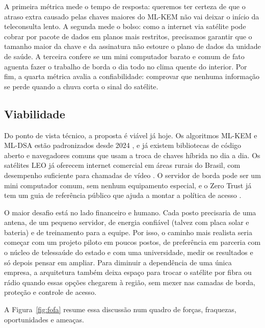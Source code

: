 \documentclass[12pt,a4paper]{article}
\begin{document}
A primeira métrica mede o tempo de resposta: queremos ter certeza de que o atraso extra causado pelas chaves maiores do ML-KEM não vai deixar o início da teleconsulta lento. A segunda mede o bolso: como a internet via satélite pode cobrar por pacote de dados em planos mais restritos, precisamos garantir que o tamanho maior da chave e da assinatura não estoure o plano de dados da unidade de saúde. A terceira confere se um mini computador barato e comum de fato aguenta fazer o trabalho de borda o dia todo no clima quente do interior. Por fim, a quarta métrica avalia a confiabilidade: comprovar que nenhuma informação se perde quando a chuva corta o sinal do satélite.

\subsection{Viabilidade}

Do ponto de vista técnico, a proposta é viável já hoje. Os algoritmos ML-KEM e ML-DSA estão padronizados desde 2024 \cite{nist2024fips203,nist2024fips204}, e já existem bibliotecas de código aberto e navegadores comuns que usam a troca de chaves híbrida no dia a dia. Os satélites LEO já oferecem internet comercial em áreas rurais do Brasil, com desempenho suficiente para chamadas de vídeo \cite{michel2022starlink}. O servidor de borda pode ser um mini computador comum, sem nenhum equipamento especial, e o Zero Trust já tem um guia de referência público que ajuda a montar a política de acesso \cite{rose2020zta}.

O maior desafio está no lado financeiro e humano. Cada posto precisaria de uma antena, de um pequeno servidor, de energia confiável (talvez com placa solar e bateria) e de treinamento para a equipe. Por isso, o caminho mais realista seria começar com um projeto piloto em poucos postos, de preferência em parceria com o núcleo de telessaúde do estado e com uma universidade, medir os resultados e só depois pensar em ampliar. Para diminuir a dependência de uma única empresa, a arquitetura também deixa espaço para trocar o satélite por fibra ou rádio quando essas opções chegarem à região, sem mexer nas camadas de borda, proteção e controle de acesso.

A Figura~\ref{fig:fofa} resume essa discussão num quadro de forças, fraquezas, oportunidades e ameaças.
\end{document}
